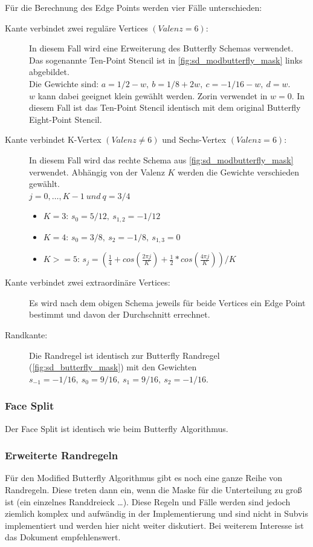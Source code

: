 Für die Berechnung des Edge Points werden vier Fälle unterschieden:
\begin{description}
\item[Kante verbindet zwei reguläre Vertices \((Valenz = 6)\):]
In diesem Fall wird eine Erweiterung
des Butterfly Schemas verwendet. Das sogenannte Ten-Point Stencil ist in \autoref{fig:sd_modbutterfly_mask} links abgebildet.\\
Die Gewichte sind:
\(a = 1/2 - w,\ b = 1/8 + 2w,\ c = -1/16 - w,\ d = w\).\\
\(w\) kann dabei geeignet klein gewählt werden.
Zorin verwendet in \cite{Zorin:1996:ISM:237170.237254} \(w = 0\).
In diesem Fall ist das Ten-Point Stencil identisch mit dem original
Butterfly Eight-Point Stencil.
\item[Kante verbindet K-Vertex \((Valenz \neq 6)\) und Sechs-Vertex \((Valenz = 6)\):]
In diesem Fall wird das rechte Schema aus \autoref{fig:sd_modbutterfly_mask} verwendet.
Abhängig von der Valenz \(K\) werden die Gewichte verschieden gewählt.\\
\(j = 0, \ldots, K - 1\ und\ q = 3/4\)
\begin{itemize}
 \item \(K = 3\): \(s_0 = 5/12,\ s_{1,2} = -1/12\)
 \item \(K = 4\): \(s_0 = 3/8,\ s_{2} = -1/8,\ s_{1,3} = 0\)
 \item \(K >= 5\): \(s_j = (\frac{1}{4}+ cos(\frac{2 \pi j}{K}) + \frac{1}{2} * cos(\frac{4 \pi j}{K}))/K\)
\end{itemize}
\item[Kante verbindet zwei extraordinäre Vertices:]
Es wird nach dem obigen Schema jeweils für beide Vertices ein Edge Point bestimmt und
davon der Durchschnitt errechnet.
\item[Randkante:] Die Randregel ist identisch zur Butterfly Randregel
(\autoref{fig:sd_butterfly_mask}) mit den Gewichten
\(s_{-1} = -1/16,\ s_0 = 9/16,\ s_1 = 9/16,\ s_2 = -1/16\).
\end{description}
\cite{Zorin:1996:ISM:237170.237254}
\cite[S. 72ff]{Zorin.subdivcourse}
\cite{Gamasutra}
\cite{Sharp}


\subsubsection*{Face Split}
Der Face Split ist identisch wie beim Butterfly Algorithmus.
\cite{Zorin:1996:ISM:237170.237254}
\cite[S. 72ff]{Zorin.subdivcourse}

\subsubsection*{Erweiterte Randregeln}

Für den Modified Butterfly Algorithmus gibt es noch eine ganze Reihe von
Randregeln. Diese treten dann ein, wenn die Maske für die Unterteilung zu groß ist
(ein einzelnes Randdreieck \ldots).
Diese Regeln und Fälle werden sind jedoch ziemlich komplex und aufwändig in der Implementierung
und sind nicht in Subvis implementiert und werden hier nicht weiter diskutiert.
Bei weiterem Interesse ist das Dokument \cite[S. 74f]{Zorin.subdivcourse}
empfehlenswert.

